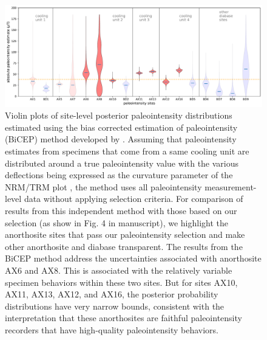 \documentclass[9pt,twoside,lineno]{pnas-new}
\begin{document}
\begin{figure}[h!]
\noindent\includegraphics[width=17.8 cm]{PINT_BiCEP.pdf}
\centering
\caption{{Violin plots of site-level posterior paleointensity distributions estimated using the bias corrected estimation of paleointensity (BiCEP) method developed by \citealp{Cych2021a}. Assuming that paleointensity estimates from specimens that come from a same cooling unit are distributed around a true paleointensity value with the various deflections being expressed as the curvature parameter of the NRM/TRM plot \cite{Arai1963a, Paterson2011a}, the method uses all paleointensity measurement-level data without applying selection criteria. For comparison of results from this independent method with those based on our selection (as show in Fig. 4 in manuscript), we highlight the anorthosite sites that pass our paleointensity selection and make other anorthosite and diabase transparent. The results from the BiCEP method address the uncertainties associated with anorthosite AX6 and AX8. This is associated with the relatively variable specimen behaviors within these two sites. But for sites AX10, AX11, AX13, AX12, and AX16, the posterior probability distributions have very narrow bounds, consistent with the interpretation that these anorthosites are faithful paleointensity recorders that have high-quality paleointensity behaviors. }}
\label{fig:PINT_BiCEP}
\end{figure}

\clearpage
\end{document}
